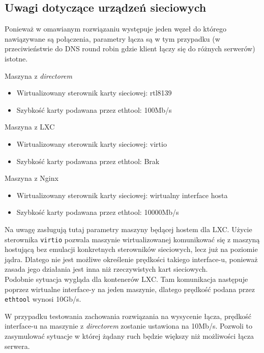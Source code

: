 \subsection{Uwagi dotyczące urządzeń sieciowych}
\label{sub:uwagi_sieciowe}
Ponieważ w omawianym rozwiązaniu występuje jeden węzeł do którego nawiązywane są połączenia, parametry łącza są w tym przypadku (w przeciwieństwie do DNS round robin gdzie klient łączy się do różnych serwerów) istotne.
\begin{description}
	\item{Maszyna z \textit{directorem}}
		\begin{itemize}
			\item Wirtualizowany sterownik karty sieciowej: rtl8139
			\item Szybkość karty podawana przez ethtool: 100Mb/s
		\end{itemize}
	\item{Maszyna z LXC}
		\begin{itemize}
			\item Wirtualizowany sterownik karty sieciowej: virtio
			\item Szybkość karty podawana przez ethtool: Brak
		\end{itemize}
	\item{Maszyna z Nginx}
		\begin{itemize}
			\item Wirtualizowany sterownik karty sieciowej: wirtualny interface hosta
			\item Szybkość karty podawana przez ethtool: 10000Mb/s
		\end{itemize}
\end{description}
Na uwagę zasługują tutaj parametry maszyny będącej hostem dla LXC\@.
Użycie sterownika \texttt{virtio} pozwala maszynie wirtualizowanej komunikować się z maszyną hostującą bez emulacji konkretnych sterowników sieciowych, lecz już na poziomie jądra.
Dlatego nie jest możliwe określenie prędkości takiego interface-u, ponieważ zasada jego działania jest inna niż rzeczywistych kart sieciowych.\\
Podobnie sytuacja wygląda dla kontenerów LXC\@.
Tam komunikacja następuje poprzez wirtualne interface-y na jeden maszynie, dlatego prędkość podana przez \texttt{ethtool} wynosi 10Gb/s.

W przypadku testowania zachowania rozwiązania na wysycenie łącza, prędkość interface-u na maszynie z \textit{directorem} zostanie ustawiona na 10Mb/s.
Pozwoli to zasymulować sytuacje w której żądany ruch będzie większy niż możliwości łącza serwera.
